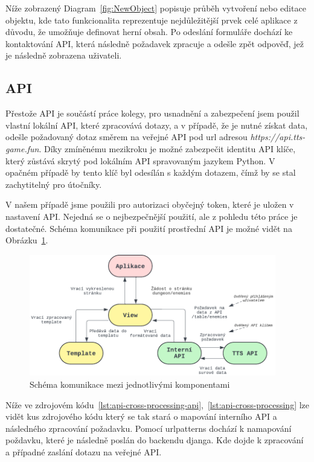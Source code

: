 Níže zobrazený Diagram~\ref{fig:NewObject} popisuje průběh vytvoření nebo editace objektu, kde tato funkcionalita reprezentuje nejdůležitější prvek celé aplikace z důvodu, že umožňuje definovat herní obsah. Po odeslání formuláře dochází ke kontaktování API, která následně požadavek zpracuje a odešle zpět odpověď, jež je následně zobrazena uživateli.


\subsection{API}
\label{subsec:implementation-api}
Přestože API je součástí práce kolegy, pro usnadnění a zabezpečení jsem použil vlastní lokální API, které zpracovává dotazy, a v případě, že je nutné získat data, odešle požadovaný dotaz směrem na veřejné API pod url adresou \textit{https://api.tts-game.fun}. Díky zmíněnému mezikroku je možné zabezpečit identitu API klíče, který zůstává skrytý pod lokálním API spravovaným jazykem Python. V opačném případě by tento klíč byl odesílán s každým dotazem, čímž by se stal zachytitelný pro útočníky.

V našem případě jsme použili pro autorizaci obyčejný token, které je uložen v nastavení API. Nejedná se o nejbezpečnější použití, ale z pohledu této práce je dostatečné. Schéma komunikace při použití prostřední API je možné vidět na Obrázku~\ref{fig:api_communication}.

\begin{figure}[H]
    \centering
    \includegraphics[width=0.96\textwidth]{diagrams/API_Communication}
    \caption{Schéma komunikace mezi jednotlivými komponentami}
    \label{fig:api_communication}
\end{figure}

Níže ve zdrojovém kódu~\ref{lst:api-cross-processing-api},~\ref{lst:api-cross-processing} lze vidět kus zdrojového kódu který se tak stará o mapování interního API a následného zpracování požadavku. Pomocí urlpatterns dochází k namapování poždavku, které je následně poslán do backendu djanga. Kde dojde k zpracování a případné zaslání dotazu na veřejné API\@.

